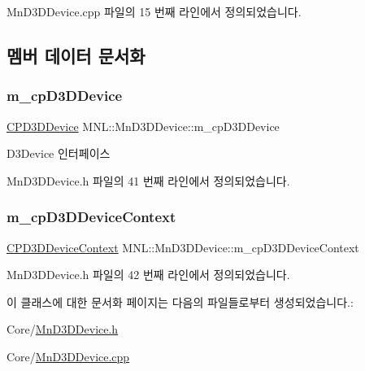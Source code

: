 Mn\+D3\+D\+Device.\+cpp 파일의 15 번째 라인에서 정의되었습니다.



\subsection{멤버 데이터 문서화}
\mbox{\label{class_m_n_l_1_1_mn_d3_d_device_a799a2d8f1c5b2c3fdc2e003952279a4f}} 
\subsubsection{\texorpdfstring{m\+\_\+cp\+D3\+D\+Device}{m\_cpD3DDevice}}
{\footnotesize\ttfamily \hyperlink{namespace_m_n_l_a1eec210db8f309a4a9ac0d9658784c31}{C\+P\+D3\+D\+Device} M\+N\+L\+::\+Mn\+D3\+D\+Device\+::m\+\_\+cp\+D3\+D\+Device\hspace{0.3cm}{\ttfamily [private]}}



D3\+Device 인터페이스 



Mn\+D3\+D\+Device.\+h 파일의 41 번째 라인에서 정의되었습니다.

\mbox{\label{class_m_n_l_1_1_mn_d3_d_device_a718aa02b1c1e40c4f3b91b6a3c68eff2}} 
\subsubsection{\texorpdfstring{m\+\_\+cp\+D3\+D\+Device\+Context}{m\_cpD3DDeviceContext}}
{\footnotesize\ttfamily \hyperlink{namespace_m_n_l_aab3aabb6c9360e44ddc8b0bb563c2107}{C\+P\+D3\+D\+Device\+Context} M\+N\+L\+::\+Mn\+D3\+D\+Device\+::m\+\_\+cp\+D3\+D\+Device\+Context\hspace{0.3cm}{\ttfamily [private]}}



Mn\+D3\+D\+Device.\+h 파일의 42 번째 라인에서 정의되었습니다.



이 클래스에 대한 문서화 페이지는 다음의 파일들로부터 생성되었습니다.\+:\begin{DoxyCompactItemize}
\item 
Core/\hyperlink{_mn_d3_d_device_8h}{Mn\+D3\+D\+Device.\+h}\item 
Core/\hyperlink{_mn_d3_d_device_8cpp}{Mn\+D3\+D\+Device.\+cpp}\end{DoxyCompactItemize}
